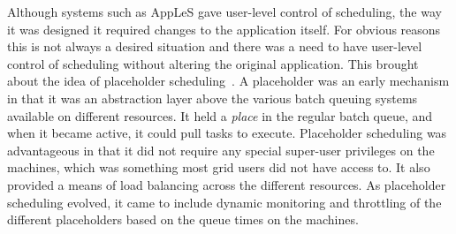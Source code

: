 \documentclass{sig-alternate}
\begin{document}
Although systems such as AppLeS gave user-level control of scheduling, the way
it was designed it required changes to the application itself.
For obvious reasons this is not always a desired situation and there was a need
to have user-level control of scheduling without altering the original
application.
This brought about the idea of placeholder
scheduling~\cite{Pinchak02practicalheterogeneous}.
A placeholder was an early \pilot mechanism in that it was an abstraction layer
above the various batch queuing systems available on different resources.
It held a \textit{place} in the regular batch queue, and when it
became active, it could pull tasks to execute.  Placeholder scheduling
was advantageous in that it did not require any special super-user
privileges on the machines, which was something most grid users did
not have access to.  It also provided a means of load balancing across
the different resources.  As placeholder scheduling evolved, it came
to include dynamic monitoring and throttling of the different
placeholders based on the queue times on the machines.




\end{document}
